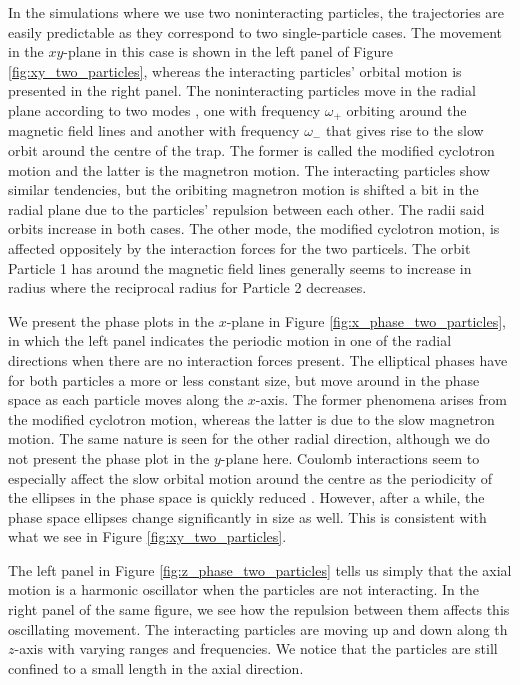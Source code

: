 In the simulations where we use two noninteracting particles, the trajectories are easily predictable as they correspond to two single-particle cases. The movement in the $xy$-plane in this case is shown in the left panel of Figure \ref{fig:xy_two_particles}, whereas the interacting particles' orbital motion is presented in the right panel. The noninteracting particles move in the radial plane according to two modes , one with frequency $\omega_+$ orbiting around the magnetic field lines and another with frequency $\omega_-$ that gives rise to the slow orbit around the centre of the trap. The former is called the modified cyclotron motion and the latter is the magnetron motion. The interacting particles show similar tendencies, but the oribiting magnetron motion is shifted a bit in the radial plane due to the particles' repulsion between each other. The radii said orbits increase in both cases. The other mode, the modified cyclotron motion, is affected oppositely by the interaction forces for the two particels. The orbit Particle 1 has around the magnetic field lines generally seems to increase in radius where the reciprocal radius for Particle 2 decreases.


We present the phase plots in the $x$-plane in Figure \ref{fig:x_phase_two_particles}, in which the left panel indicates the periodic motion in one of the radial directions when there are no interaction forces present. The elliptical phases have for both particles a more or less constant size, but move around in the phase space as each particle moves along the $x$-axis. The former phenomena arises from the modified cyclotron motion, whereas the latter is due to the slow magnetron motion. The same nature is seen for the other radial direction, although we do not present the phase plot in the $y$-plane here. Coulomb interactions seem to especially affect the slow orbital motion around the centre as the periodicity of the ellipses in the phase space is quickly reduced . However, after a while, the phase space ellipses change significantly in size as well. This is consistent with what we see in Figure \ref{fig:xy_two_particles}.  

The left panel in Figure \ref{fig:z_phase_two_particles} tells us simply that the axial motion is a harmonic oscillator  when the particles are not interacting. In the right panel of the same figure, we see how the repulsion between them affects this oscillating movement. The interacting particles are moving up and down along th $z$-axis with varying ranges and frequencies. We notice that the particles are still confined to a small length in the axial direction. 


